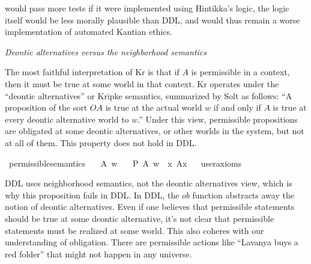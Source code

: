 \begin{isabellebody}
\begin{isamarkuptext}
would pass more tests if it were implemented using Hintikka's logic, the logic itself would be less 
morally plausible than DDL, and would thus remain a worse implementation of automated Kantian ethics.%
\end{isamarkuptext}\isamarkuptrue%
%
\noindent \emph{Deontic alternatives versus the neighborhood semantics}
%
\begin{isamarkuptext}%
The most faithful interpretation of Kr is that if $A$ is permissible in a context, then 
it must be true at some world in that context. Kr operates under the ``deontic alternatives'' or Kripke semantics, 
summarized by Solt \citep{solt} as follows: ``A proposition of the sort $O A$ is true at the actual world $w$ if and
only if $A$ is true at every deontic alternative world to $w$.'' Under this view, permissible propositions
are obligated at some deontic alternatives, or other worlds in the system, but not at all of them. This
property does not hold in DDL.%
\end{isamarkuptext}\isamarkuptrue%
\isamarkupfalse%
\ permissible{\isacharunderscore}semantics{\isacharcolon}\isanewline
\ \ \ A\ w\isanewline
\ \ \ {\isachardoublequoteopen}{\isacharparenleft}P\ {\isacharbraceleft}A{\isacharbraceright}{\isacharparenright}\ w\ {\isasymlongrightarrow}\ {\isacharparenleft}{\isasymexists}x{\isachardot}\ A{\isacharparenleft}x{\isacharparenright}{\isacharparenright}{\isachardoublequoteclose}\isanewline
\ \ \isamarkupfalse%
{\isacharbrackleft}user{\isacharunderscore}axioms{\isacharbrackright}%
\isadelimproof
\ %
\endisadelimproof
%
\isatagproof
{}\isamarkupfalse%
\isanewline
%
%
\endisatagproof
{\isafoldproof}%
%
\isadelimproof
%
\endisadelimproof
%
\begin{isamarkuptext}%
DDL uses neighborhood semantics, not the deontic alternatives view, which is why this
 proposition fails in DDL. In DDL, the $ob$ function abstracts away the notion of
 deontic alternatives. Even if one believes that permissible 
statements should be true at some deontic alternative, it's not clear that permissible statements
 must be realized at some world. This also coheres with our understanding of obligation. There 
are permissible actions like ``Lavanya buys a red folder'' that might not happen in any universe.


\end{isamarkuptext}
\end{isabellebody}

